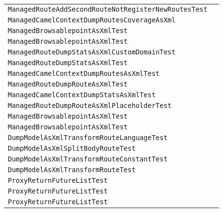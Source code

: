 \begin{center}
\begin{tabular}{ll}
\lstinline/ManagedRouteAddSecondRouteNotRegisterNewRoutesTest/&\raisebox{0pt}{\lstinline/testRouteAddSecondRoute()/}\\
\lstinline/ManagedCamelContextDumpRoutesCoverageAsXml/&\raisebox{0pt}{\lstinline/testRouteCoverageStats()/}\\
\lstinline/ManagedBrowsablepointAsXmlTest/&\raisebox{0pt}{\lstinline/testBrowseablepointAsXmlAllIncludeBody()/}\\
\lstinline/ManagedBrowsablepointAsXmlTest/&\raisebox{0pt}{\lstinline/testBrowseablepointAsXmlAll()/}\\
\lstinline/ManagedRouteDumpStatsAsXmlCustomDomainTest/&\raisebox{0pt}{\lstinline/testPerformanceCounterStats()/}\\
\lstinline/ManagedRouteDumpStatsAsXmlTest/&\raisebox{0pt}{\lstinline/testPerformanceCounterStats()/}\\
\lstinline/ManagedCamelContextDumpRoutesAsXmlTest/&\raisebox{0pt}{\lstinline/testDumpAsXml()/}\\
\lstinline/ManagedRouteDumpRouteAsXmlTest/&\raisebox{0pt}{\lstinline/testDumpAsXml()/}\\
\lstinline/ManagedCamelContextDumpStatsAsXmlTest/&\raisebox{0pt}{\lstinline/testPerformanceCounterStats()/}\\
\lstinline/ManagedRouteDumpRouteAsXmlPlaceholderTest/&\raisebox{0pt}{\lstinline/testDumpAsXml()/}\\
\lstinline/ManagedBrowsablepointAsXmlTest/&\raisebox{0pt}{\lstinline/testBrowseablepointAsXmlRange()/}\\
\lstinline/ManagedBrowsablepointAsXmlTest/&\raisebox{0pt}{\lstinline/testBrowseablepointAsXmlRangeIncludeBody()/}\\
\lstinline/DumpModelAsXmlTransformRouteLanguageTest/&\raisebox{0pt}{\lstinline/testDumpModelAsXml()/}\\
\lstinline/DumpModelAsXmlSplitBodyRouteTest/&\raisebox{0pt}{\lstinline/testDumpModelAsXml()/}\\
\lstinline/DumpModelAsXmlTransformRouteConstantTest/&\raisebox{0pt}{\lstinline/testDumpModelAsXml()/}\\
\lstinline/DumpModelAsXmlTransformRouteTest/&\raisebox{0pt}{\lstinline/testDumpModelAsXml()/}\\
\lstinline/ProxyReturnFutureListTest/&\raisebox{0pt}{\lstinline/testFutureListCallTwoTimes()/}\\
\lstinline/ProxyReturnFutureListTest/&\raisebox{0pt}{\lstinline/testFutureListCallTwoTimes()/}\\
\lstinline/ProxyReturnFutureListTest/&\raisebox{0pt}{\lstinline/testFutureListCallTwoTimes()/}\\

\end{tabular}
\end{center}
